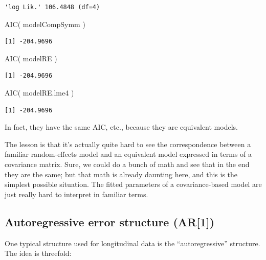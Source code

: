 \documentclass[
  letterpaper,
  DIV=11,
  numbers=noendperiod]{scrreprt}
\newenvironment{Shaded}{\begin{snugshade}}{\end{snugshade}}
\newcommand{\FunctionTok}[1]{\textcolor[rgb]{0.02,0.16,0.49}{#1}}
\newcommand{\NormalTok}[1]{\textcolor[rgb]{0.00,0.44,0.13}{#1}}
\begin{document}
\begin{verbatim}
'log Lik.' 106.4848 (df=4)
\end{verbatim}

\begin{Shaded}
\begin{Highlighting}[]
\FunctionTok{AIC}\NormalTok{( modelCompSymm )}
\end{Highlighting}
\end{Shaded}

\begin{verbatim}
[1] -204.9696
\end{verbatim}

\begin{Shaded}
\begin{Highlighting}[]
\FunctionTok{AIC}\NormalTok{( modelRE )}
\end{Highlighting}
\end{Shaded}

\begin{verbatim}
[1] -204.9696
\end{verbatim}

\begin{Shaded}
\begin{Highlighting}[]
\FunctionTok{AIC}\NormalTok{( modelRE.lme4 )}
\end{Highlighting}
\end{Shaded}

\begin{verbatim}
[1] -204.9696
\end{verbatim}

In fact, they have the same AIC, etc., because they are equivalent
models.

The lesson is that it's actually quite hard to see the correspondence
between a familiar random-effects model and an equivalent model
expressed in terms of a covariance matrix. Sure, we could do a bunch of
math and see that in the end they are the same; but that math is already
daunting here, and this is the simplest possible situation. The fitted
parameters of a covariance-based model are just really hard to interpret
in familiar terms.

\hypertarget{autoregressive-error-structure-ar1}{%
\subsection{Autoregressive error structure
(AR{[}1{]})}\label{autoregressive-error-structure-ar1}}

One typical structure used for longitudinal data is the
``autoregressive'' structure. The idea is threefold:
\end{document}
